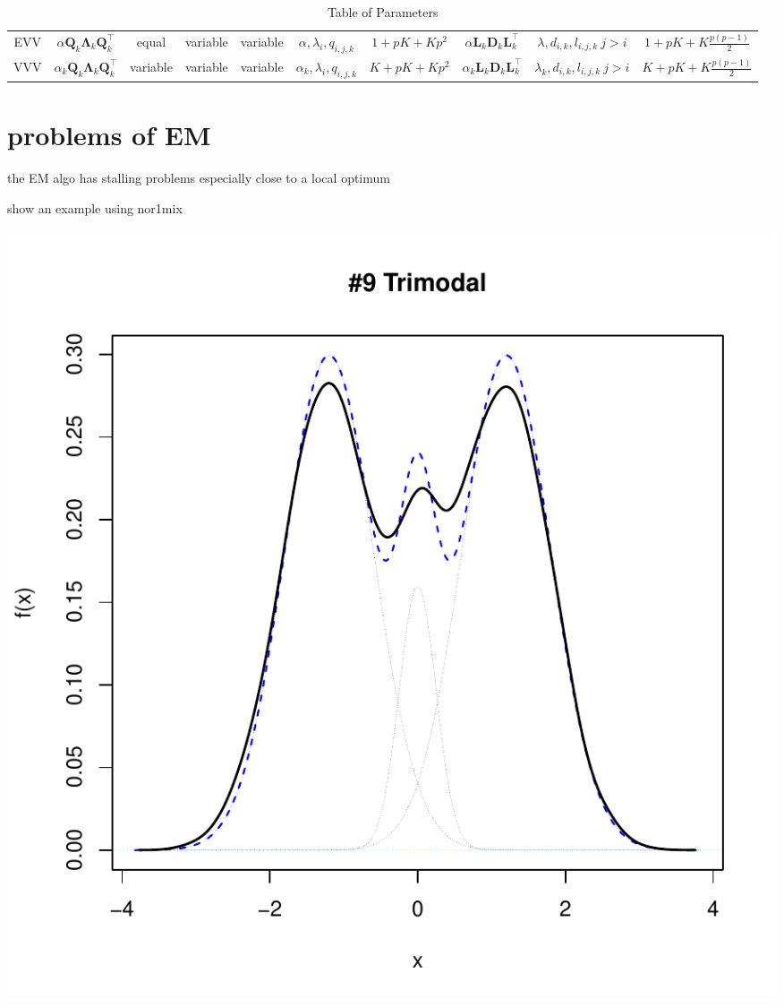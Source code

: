 \begin{table}[!htb]
{\begin{tabular}{| c | c c c c c c | c c c |}
        \hline
        EVV    & $ \alpha \pmb{Q}_k \pmb{\Lambda}_k \pmb{Q}_k^\top $ & equal & variable & variable & $ \alpha, \lambda_{i}, q_{i,j,k} $ & $ 1+pK+Kp^2 $ & $ \alpha \pmb{L}_k \pmb{D}_k \pmb{L}_k^\top $ & $ \lambda, d_{i,k}, l_{i,j,k}\ j>i $ & $ 1+pK+K\frac{p(p-1)}{2} $ \\
        VVV    & $ \alpha_k \pmb{Q}_k \pmb{\Lambda}_k \pmb{Q}_k^\top $ & variable & variable & variable & $ \alpha_k, \lambda_{i}, q_{i,j,k} $ & $ K+pK+Kp^2 $ & $ \alpha_k \pmb{L}_k \pmb{D}_k \pmb{L}_k^\top $ & $ \lambda_k, d_{i,k}, l_{i,j,k}\ j>i $ & $ K+pK+K\frac{p(p-1)}{2} $ \\
        \hline
    \end{tabular}

    \label{table:1}

}

\caption{Table of Parameters}

\end{table}


\clearpage

\section{problems of EM}


the EM algo has stalling problems especially close to a local optimum

show an example using nor1mix



\includegraphics{chapter1-002}



